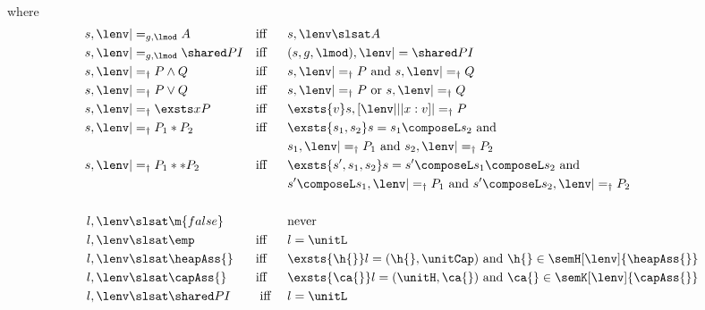 \begin{definition}
\begin{align*}
%  
\end{align*}
%
where 
%
\begin{align*}
  s, \lenv &|=_{g,\lmod} A &&\text{iff}&& s, \lenv \slsat A\\
%  
  s, \lenv &|=_{g,\lmod} \shared P I &&\text{iff}&&
  (s,g,\lmod), \lenv |= \shared P I\\
%
%  
  s, \lenv &|=_\dagger P \land Q
  &&\text{iff}&& s, \lenv |=_\dagger P\text{ and } s, \lenv |=_\dagger Q\\
%  
  s, \lenv &|=_\dagger P \lor Q
  &&\text{iff}&& s, \lenv |=_\dagger P\text{ or } s, \lenv |=_\dagger Q\\
%  
  s, \lenv &|=_\dagger \exsts x P
  &&\text{iff}&& \exsts{v} s, [\lenv|||x:v] |=_\dagger P\\
%  
  s, \lenv &|=_\dagger P_1 * P_2 &&\text{iff}&&
  \exsts{s_1, s_2} s = s_1 \composeL s_2 \text{ and}\\
  &&&&& s_1, \lenv |=_\dagger P_1 \text{ and } s_2, \lenv |=_\dagger P_2\\
%  
  s, \lenv &|=_\dagger P_1 ** P_2 &&\text{iff}&&
  \exsts{s', s_1, s_2} s = s' \composeL s_1 \composeL s_2\text{ and}\\
  &&&&&
  s' \composeL s_1, \lenv |=_\dagger P_1 \text{ and }
  s' \composeL s_2, \lenv |=_\dagger P_2\\\\
%  
%
%
%
%
%
%
  l,\lenv &\slsat \m{false} &&&& \text{never}\\
%  
  l, \lenv &\slsat \emp && \text{iff} && l = \unitL \\
%  
  l, \lenv &\slsat \heapAss{} && \text{iff} && \exsts{\h{}} l = (\h{}, \unitCap) \text{ and } \h{} \in \semH[\lenv]{\heapAss{}} \\
%  
  l, \lenv &\slsat \capAss{} && \text{iff} && \exsts{\ca{}} l = (\unitH, \ca{}) \text{ and } \ca{} \in \semK[\lenv]{\capAss{}} \\
%  
  l, \lenv &\slsat \shared P I && \text{ iff } && l = \unitL\\

\end{align*}
\end{definition}
